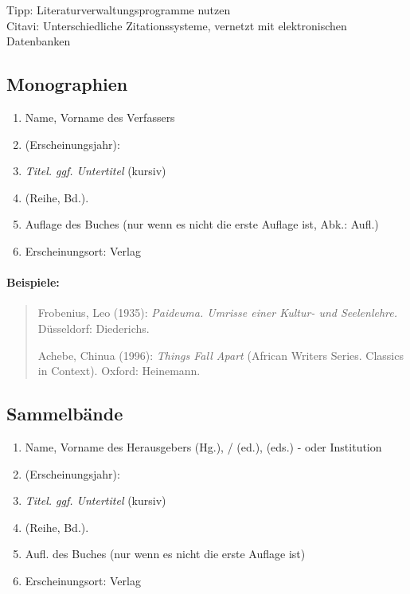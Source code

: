 \documentclass[ 12pt,
                titlepage,
                parskip=half,
                version=first,
                bibliography=totocnumbered,
                final,
                listof=totoc]{scrartcl}
\begin{document}
Tipp: Literaturverwaltungsprogramme nutzen\\ Citavi: Unterschiedliche
Zitationssysteme, vernetzt mit elektronischen Datenbanken

\subsection{Monographien}
\label{sec:sub_monographien}

\begin{enumerate}
    \item Name, Vorname des Verfassers
    \item (Erscheinungsjahr):
    \item \emph{Titel. ggf. Untertitel} (kursiv)
    \item (Reihe, Bd.).
    \item Auflage des Buches (nur wenn es nicht die erste Auflage ist, Abk.:
    Aufl.)
    \item Erscheinungsort: Verlag
\end{enumerate}

\paragraph{Beispiele:}
\begin{quote}
Frobenius, Leo (1935): \emph{Paideuma. Umrisse einer Kultur- und Seelenlehre.}
Düsseldorf: Diederichs.

Achebe, Chinua (1996): \emph{Things Fall Apart} (African Writers Series.
Classics in Context). Oxford: Heinemann.
\end{quote}

\subsection{Sammelbände}
\label{sec:sub_sammelbände}

\begin{samepage}
\begin{enumerate}
    \item Name, Vorname des Herausgebers (Hg.), / (ed.), (eds.) - oder
    Institution
    \item (Erscheinungsjahr):
    \item \emph{Titel. ggf. Untertitel} (kursiv)
    \item (Reihe, Bd.).
    \item Aufl. des Buches (nur wenn es nicht die erste Auflage ist)
    \item Erscheinungsort: Verlag
\end{enumerate}
\end{samepage}
\end{document}
